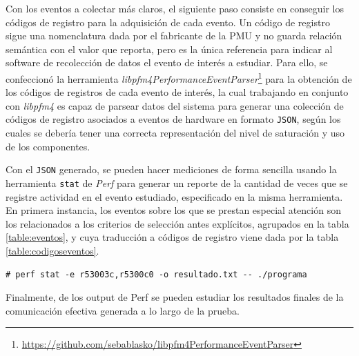 Con los eventos a colectar más claros, el siguiente paso consiste en conseguir los códigos de registro para la adquisición de cada evento. Un código de registro sigue una nomenclatura dada por el fabricante de la PMU y no guarda relación semántica con el valor que reporta, pero es la única referencia para indicar al software de recolección de datos el evento de interés a estudiar. Para ello, se confeccionó la herramienta \emph{libpfm4PerformanceEventParser}\footnote{\url{https://github.com/sebablasko/libpfm4PerformanceEventParser}} para la obtención de los códigos de registros de cada evento de interés, la cual trabajando en conjunto con \emph{libpfm4} es capaz de parsear datos del sistema para generar una colección de códigos de registro asociados a eventos de hardware en formato \verb=JSON=, según los cuales se debería tener una correcta representación del nivel de saturación y uso de los componentes.

Con el \verb=JSON= generado, se pueden hacer mediciones de forma sencilla usando la herramienta \verb=stat= de \emph{Perf} para generar un reporte de la cantidad de veces que se registre actividad en el evento estudiado, especificado en la misma herramienta. En primera instancia, los eventos sobre los que se prestan especial atención son los relacionados a los criterios de selección antes explícitos, agrupados en la tabla \ref{table:eventos}, y cuya traducción a códigos de registro viene dada por la tabla \ref{table:codigoseventos}.


\begin{lstlisting}[style=BashInputStyle, breaklines=true, captionpos=b, caption={Ejemplo de uso de Perf para colectar datos de una colección de eventos sobre un script llamado programa. En éste caso se configura para colectar datos de 2 eventos y dejar el reporte de salida en un archivo resultado.txt}]
	# perf stat -e r53003c,r5300c0 -o resultado.txt -- ./programa
\end{lstlisting}

Finalmente, de los output de Perf se pueden estudiar los resultados finales de la comunicación efectiva generada a lo largo de la prueba.

